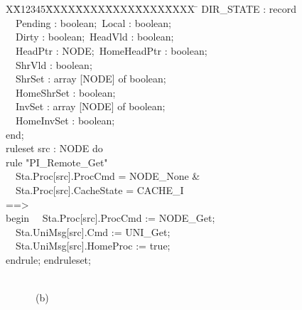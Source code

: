 \documentclass{llncs-new}
\newlength{\fminilength}
\newenvironment{fmini}[1][\linewidth]
  {\setlength{\fminilength}{#1\fboxsep-2\fboxrule}%
   \vspace{2ex}\noindent\begin{lrbox}{\fminibox}\begin{minipage}{\fminilength}%
   \mbox{ }\hfill\vspace{-2.5ex}}%
  {\end{minipage}\end{lrbox}\vspace{1ex}\hspace{0ex}%
   \framebox{\usebox{\fminibox}}}
\newenvironment{specification}
{\noindent\scriptsize
\tt\begin{fmini}\begin{tabbing}X\=X12345\=XXXX\=XXXX\=XXXX\=XXXX\=XXXX
\=\+\kill} {\end{tabbing}\normalfont\end{fmini}}
\def \twoSpaces {\ \ }
\newcommand{\forget}[1]{}
\def \twoSpaces {\ \ }
\begin{document}
{\begin{multicols}{2}
\begin{specification}
  DIR\_STATE : record\\
\indent \twoSpaces     Pending : boolean;\     Local : boolean;\\
\indent \twoSpaces     Dirty : boolean;\      HeadVld : boolean;\\
\indent \twoSpaces     HeadPtr : NODE;\      HomeHeadPtr : boolean;\\
\indent \twoSpaces     ShrVld : boolean;\\
\indent \twoSpaces     ShrSet : array [NODE] of boolean;\\
\indent \twoSpaces     HomeShrSet : boolean;\\
\indent \twoSpaces     InvSet : array [NODE] of boolean;\\
\indent \twoSpaces     HomeInvSet : boolean;\\
  end;\\

  ruleset src : NODE do\\
rule "PI\_Remote\_Get"\\
\indent \twoSpaces   Sta.Proc[src].ProcCmd = NODE\_None \&\\
\indent \twoSpaces   Sta.Proc[src].CacheState = CACHE\_I\\
==>\\
begin
\indent \twoSpaces   Sta.Proc[src].ProcCmd := NODE\_Get;\\
\indent \twoSpaces   Sta.UniMsg[src].Cmd := UNI\_Get;\\
\indent \twoSpaces   Sta.UniMsg[src].HomeProc := true;\\
endrule; endruleset;
\end{specification}\\
\twoSpaces \twoSpaces \twoSpaces \center(b)
\end{multicols}
}


\vspace{-10pt}

\forget{In our version, we add a field $HomeProc$. If $HomeProc$ is true, then this is according to the case $Proc=Home$ in the original version, else     the case where $Proc$ is a non-Home one. $HomeHeadPtr$ is added similarly in our model.  $HomeShrSet$  and     $HomeInvSet$ are added in order to model $ShrSet[Home]$ and $InvSet[Home]$ to be true in the original version. We use the assignment $Sta.UniMsg[src].HomeProc := true$ to  model   that $Sta.UniMsg[src].Proc$ is the $Home$ node. In the version shown in (b),  the symmetry between indices is preserved fully.  The aforementioned problems caused by non-symmetry are avoided, and implementation of {\sf paraVerifier} is simplified accordingly.} %
\end{document}
